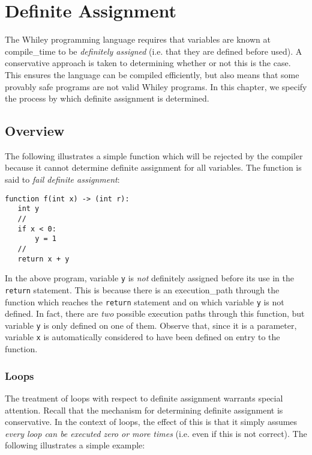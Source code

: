 \chapter{Definite Assignment}
\label{c_definite_assignment}

The Whiley programming language requires that variables are known at \gls{compile_time} to be {\em definitely assigned} (i.e. that they are defined before used).  A conservative approach is taken to determining whether or not this is the case.  This ensures the language can be compiled efficiently, but also means that some provably safe programs are not valid Whiley programs.  In this chapter, we specify the process by which definite assignment is determined.

\section{Overview}

The following illustrates a simple function which will be rejected by the compiler because it cannot determine definite assignment for all variables.  The function is said to {\em fail definite assignment}:

\begin{lstlisting}
function f(int x) -> (int r):
   int y
   //
   if x < 0:
       y = 1
   //
   return x + y
\end{lstlisting}

In the above program, variable \lstinline{y} is {\em not} definitely assigned before its use in the \lstinline{return} statement.  This is because there is an \gls{execution_path} through the function which reaches the \lstinline{return} statement and on which variable \lstinline{y} is not defined.  In fact, there are {\em two} possible execution paths through this function, but variable \lstinline{y} is only defined on one of them.  Observe that, since it is a parameter, variable \lstinline{x} is automatically considered to have been defined on entry to the function.

\subsection{Loops}

The treatment of loops with respect to definite assignment warrants special attention.  Recall that the mechanism for determining definite assignment is conservative.  In the context of loops, the effect of this is that it simply assumes {\em every loop can be executed zero or more times} (i.e. even if this is not correct).  The following illustrates a simple example:


